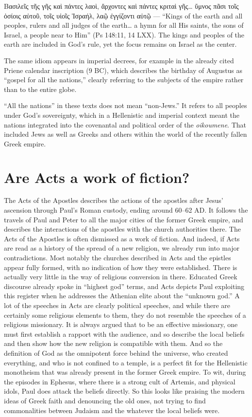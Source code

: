 Βασιλεῖς τῆς γῆς καὶ πάντες λαοὶ, ἄρχοντες καὶ πάντες κριταὶ γῆς… ὕμνος πᾶσι τοῖς ὁσίοις αὐτοῦ, τοῖς υἱοῖς Ἰσραήλ, λαῷ ἐγγίζοντι αὐτῷ --- “Kings of the earth and all peoples, rulers and all judges of the earth… a hymn for all His saints, the sons of Israel, a people near to Him” (Ps 148:11, 14 LXX).
The kings and peoples of the earth are included in God’s rule, yet the focus remains on Israel as the center.

The same idiom appears in imperial decrees, for example in the already cited Priene calendar inscription (9 BC), which describes the birthday of Augustus as “gospel for all the nations,” clearly referring to the subjects of the empire rather than to the entire globe.

“All the nations” in these texts does not mean “non-Jews.”
It refers to all peoples under God’s sovereignty, which in a Hellenistic and imperial context meant the nations integrated into the covenantal and political order of the \textit{oikoumene}.
That included Jews as well as Greeks and others within the world of the recently fallen Greek empire.

\section{Are Acts a work of fiction?}\label{sec:are-acts-a-work-of-fiction}

The Acts of the Apostles describes the actions of the apostles after Jesus' ascension through Paul's Roman custody, ending around 60--62 AD.
It follows the travels of Paul and Peter to all the major cities of the former Greek empire, and describes the interactions of the apostles with the church authorities there.
The Acts of the Apostles is often dismissed as a work of fiction.
And indeed, if Acts are read as a history of the spread of a new religion, we already run into major contradictions.
Most notably the churches described in Acts and the epistles appear fully formed, with no indication of how they were established.
There is actually very little in the way of religious conversion in there.
Educated Greek discourse already spoke in ``highest god'' terms, and Acts depicts Paul exploiting this register when he addresses the Athenian elite about the ``unknown god.''
A lot of the speeches in Acts are clearly political speeches, and while there are certainly some religious elements to them, they do not resemble the speeches of a religious missionary.
It is always argued that to be an effective missionary, one must first establish a rapport with the audience, and so describe the local beliefs and then show how the new religion is compatible with them.
And so the definition of God as the omnipotent force behind the universe, who created everything, and who is not confined to a temple, is a perfect fit for the Hellenistic monotheism that was already present in the former Greek empire.
To wit, during the episodes in Ephesus, where there is a strong cult of Artemis, and physical idols, Paul does attack the beliefs directly.
So this looks like praising the modern ideas of Greek faith and denouncing the old ones, not trying to find commonalities between Judaism and the whatever the local beliefs were.

